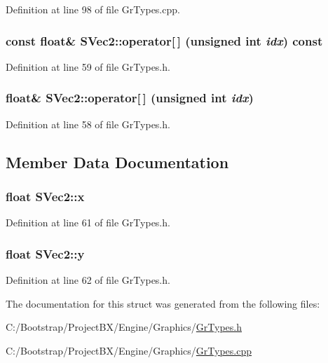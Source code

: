 Definition at line 98 of file GrTypes.cpp.\hypertarget{struct_s_vec2_fb9bae5a1ebb0b770dbe75ae750bf1c0}{
\subsubsection[{operator[]}]{\setlength{\rightskip}{0pt plus 5cm}const float\& SVec2::operator\mbox{[}$\,$\mbox{]} (unsigned int {\em idx}) const}}
\label{struct_s_vec2_fb9bae5a1ebb0b770dbe75ae750bf1c0}




Definition at line 59 of file GrTypes.h.\hypertarget{struct_s_vec2_64edf0c47810834a3c115f477bcd4824}{
\subsubsection[{operator[]}]{\setlength{\rightskip}{0pt plus 5cm}float\& SVec2::operator\mbox{[}$\,$\mbox{]} (unsigned int {\em idx})}}
\label{struct_s_vec2_64edf0c47810834a3c115f477bcd4824}




Definition at line 58 of file GrTypes.h.

\subsection{Member Data Documentation}
\hypertarget{struct_s_vec2_328ec1b6dafebcc1eb6bf84f790f39b7}{
\subsubsection[{x}]{\setlength{\rightskip}{0pt plus 5cm}float {\bf SVec2::x}}}
\label{struct_s_vec2_328ec1b6dafebcc1eb6bf84f790f39b7}




Definition at line 61 of file GrTypes.h.\hypertarget{struct_s_vec2_47cf4560950d17311222a547a98c4fde}{
\subsubsection[{y}]{\setlength{\rightskip}{0pt plus 5cm}float {\bf SVec2::y}}}
\label{struct_s_vec2_47cf4560950d17311222a547a98c4fde}




Definition at line 62 of file GrTypes.h.

The documentation for this struct was generated from the following files:\begin{CompactItemize}
\item 
C:/Bootstrap/ProjectBX/Engine/Graphics/\hyperlink{_gr_types_8h}{GrTypes.h}\item 
C:/Bootstrap/ProjectBX/Engine/Graphics/\hyperlink{_gr_types_8cpp}{GrTypes.cpp}\end{CompactItemize}
